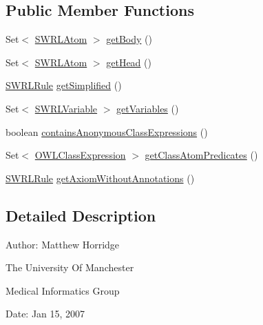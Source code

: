 \subsection*{Public Member Functions}
\begin{DoxyCompactItemize}
\item 
Set$<$ \hyperlink{interfaceorg_1_1semanticweb_1_1owlapi_1_1model_1_1_s_w_r_l_atom}{S\-W\-R\-L\-Atom} $>$ \hyperlink{interfaceorg_1_1semanticweb_1_1owlapi_1_1model_1_1_s_w_r_l_rule_aa16cf74e9faa5ec27f2cae24661bcda2}{get\-Body} ()
\item 
Set$<$ \hyperlink{interfaceorg_1_1semanticweb_1_1owlapi_1_1model_1_1_s_w_r_l_atom}{S\-W\-R\-L\-Atom} $>$ \hyperlink{interfaceorg_1_1semanticweb_1_1owlapi_1_1model_1_1_s_w_r_l_rule_a5dd03874d72bc8fa0d7b6992c7ed0d53}{get\-Head} ()
\item 
\hyperlink{interfaceorg_1_1semanticweb_1_1owlapi_1_1model_1_1_s_w_r_l_rule}{S\-W\-R\-L\-Rule} \hyperlink{interfaceorg_1_1semanticweb_1_1owlapi_1_1model_1_1_s_w_r_l_rule_a133cc93bdd6dff43b9769745b2875822}{get\-Simplified} ()
\item 
Set$<$ \hyperlink{interfaceorg_1_1semanticweb_1_1owlapi_1_1model_1_1_s_w_r_l_variable}{S\-W\-R\-L\-Variable} $>$ \hyperlink{interfaceorg_1_1semanticweb_1_1owlapi_1_1model_1_1_s_w_r_l_rule_a2c00a3800bda27cf1f88e8ffce8883f7}{get\-Variables} ()
\item 
boolean \hyperlink{interfaceorg_1_1semanticweb_1_1owlapi_1_1model_1_1_s_w_r_l_rule_a532fb7c8e988a6e053de5030d3861163}{contains\-Anonymous\-Class\-Expressions} ()
\item 
Set$<$ \hyperlink{interfaceorg_1_1semanticweb_1_1owlapi_1_1model_1_1_o_w_l_class_expression}{O\-W\-L\-Class\-Expression} $>$ \hyperlink{interfaceorg_1_1semanticweb_1_1owlapi_1_1model_1_1_s_w_r_l_rule_a1997e7880172e560d3df89319f36ebb8}{get\-Class\-Atom\-Predicates} ()
\item 
\hyperlink{interfaceorg_1_1semanticweb_1_1owlapi_1_1model_1_1_s_w_r_l_rule}{S\-W\-R\-L\-Rule} \hyperlink{interfaceorg_1_1semanticweb_1_1owlapi_1_1model_1_1_s_w_r_l_rule_ada2673f565eb47c0a6b63ce07cb7ac4f}{get\-Axiom\-Without\-Annotations} ()
\end{DoxyCompactItemize}


\subsection{Detailed Description}
Author\-: Matthew Horridge\par
 The University Of Manchester\par
 Medical Informatics Group\par
 Date\-: Jan 15, 2007\par
\par
 

